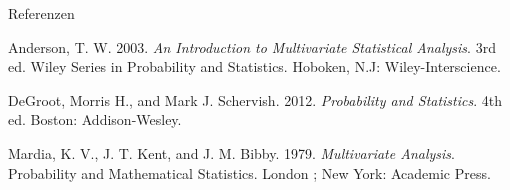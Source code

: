 \documentclass[
  8pt,
  ignorenonframetext,
]{beamer}
\newlength{\cslhangindent}
\newlength{\cslentryspacingunit} %
\newenvironment{CSLReferences}[2] %
 {%
  \setlength{\parindent}{0pt}
  \ifodd #1
  \let\oldpar\par
  \def\par{\hangindent=\cslhangindent\oldpar}
  \fi
  \setlength{\parskip}{#2\cslentryspacingunit}
 }%
 {}
\begin{document}
\begin{frame}{Referenzen}
\protect\hypertarget{referenzen}{}
\footnotesize

\hypertarget{refs}{}
\begin{CSLReferences}{1}{0}
\leavevmode{}%
Anderson, T. W. 2003. \emph{An Introduction to Multivariate Statistical
Analysis}. 3rd ed. Wiley Series in Probability and Statistics. Hoboken,
N.J: Wiley-Interscience.

\leavevmode{}%
DeGroot, Morris H., and Mark J. Schervish. 2012. \emph{Probability and
Statistics}. 4th ed. Boston: Addison-Wesley.

\leavevmode{}%
Mardia, K. V., J. T. Kent, and J. M. Bibby. 1979. \emph{Multivariate
Analysis}. Probability and Mathematical Statistics. London ; New York:
Academic Press.

\end{CSLReferences}
\end{frame}
\end{document}
